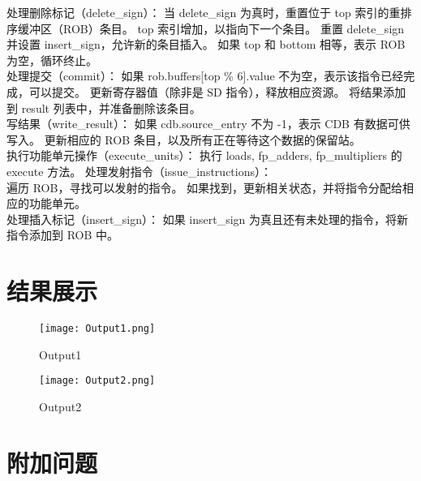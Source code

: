 \documentclass{article}
\begin{document}
处理删除标记（delete\_sign）：
当 delete\_sign 为真时，重置位于 top 索引的重排序缓冲区（ROB）条目。
top 索引增加，以指向下一个条目。
重置 delete\_sign 并设置 insert\_sign，允许新的条目插入。
如果 top 和 bottom 相等，表示 ROB 为空，循环终止。\\
处理提交（commit）：
如果 rob.buffers[top \% 6].value 不为空，表示该指令已经完成，可以提交。
更新寄存器值（除非是 SD 指令），释放相应资源。
将结果添加到 result 列表中，并准备删除该条目。\\
写结果（write\_result）：
如果 cdb.source\_entry 不为 -1，表示 CDB 有数据可供写入。
更新相应的 ROB 条目，以及所有正在等待这个数据的保留站。\\
执行功能单元操作（execute\_units）：
执行 loads, fp\_adders, fp\_multipliers 的 execute 方法。
处理发射指令（issue\_instructions）：\\
遍历 ROB，寻找可以发射的指令。
如果找到，更新相关状态，并将指令分配给相应的功能单元。\\
处理插入标记（insert\_sign）：
如果 insert\_sign 为真且还有未处理的指令，将新指令添加到 ROB 中。

\section{结果展示}
\begin{figure}[H]
    \centering
    \texttt{[image: Output1.png]}
    \caption{Output1}
    \label{fig: Output1}
\end{figure}


\begin{figure}[H]
    \centering
    \texttt{[image: Output2.png]}
    \caption{Output2}
    \label{fig: Output2}
\end{figure}

\newpage

\section{附加问题}
\end{document}
